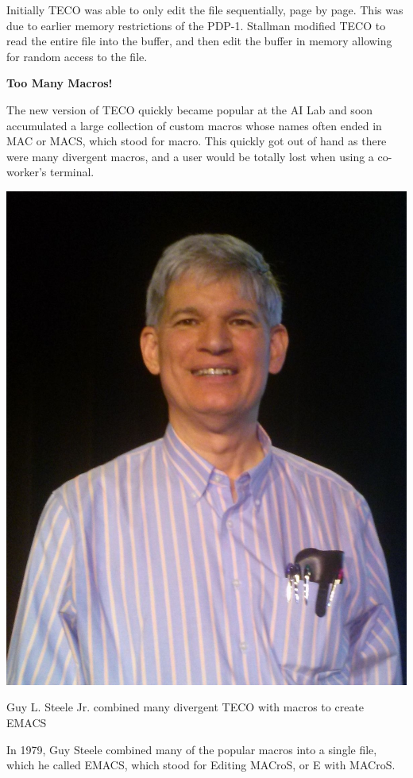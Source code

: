Initially TECO was able to only edit the file
sequentially, page by page. This was due to earlier
memory restrictions of the PDP-1.
Stallman modified TECO to read the entire file into
the buffer, and then edit the buffer in memory
allowing for random access to the file.

\textbf{Too Many Macros!}

The new version of TECO quickly became popular at
the AI Lab and soon accumulated a large collection
of custom macros whose names often ended in MAC or
MACS, which stood for macro.
This quickly got out of hand as there were many
divergent macros, and a user would be totally
lost when using a co-worker's terminal.

\begin{marginfigure}
  \includegraphics{images/png/steele.png}
  \caption{Guy L. Steele Jr. combined many divergent TECO with macros to create EMACS}
\end{marginfigure}


In 1979, Guy Steele combined many of the popular
macros into a single file, which he called EMACS,
which stood for Editing MACroS, or E with MACroS.

